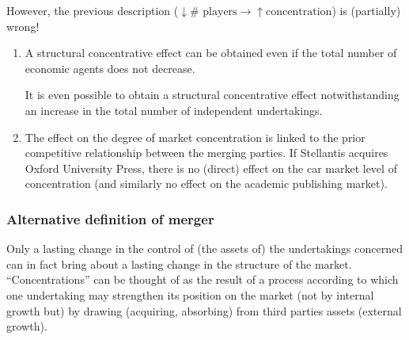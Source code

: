     \noindent
    However, the previous description (\( \downarrow \# \text{ players} \rightarrow \uparrow \text{concentration} \)) is (partially) wrong!

    \begin{enumerate}[label=\alph*.]
        \item A structural concentrative effect can be obtained even if the total number of economic agents does not decrease.
        
            It is even possible to obtain a structural concentrative effect notwithstanding an increase in the total number of independent undertakings.
            

        \item The effect on the degree of market concentration is linked to the prior competitive relationship between the merging parties. If Stellantis acquires Oxford University Press, there is no (direct) effect on the car market level of concentration (and similarly no effect on the academic publishing market).
    \end{enumerate}

        \subsubsection*{Alternative definition of merger}


            Only a lasting change in the control of (the assets of) the undertakings concerned can in fact bring about a lasting change in the structure of the market. “Concentrations” can be thought of as the result of a process according to which one undertaking may strengthen its position on the market (not by internal growth but) by drawing (acquiring, absorbing) from third parties assets (external growth).

